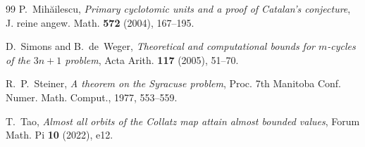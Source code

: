 \documentclass[11pt, a4paper]{amsart}
\theoremstyle{plain}
\theoremstyle{definition}
\theoremstyle{remark}
\begin{document}
\begin{thebibliography}{99}
P.~Mih\u{a}ilescu,
\emph{Primary cyclotomic units and a proof of Catalan's
conjecture},
J. reine angew. Math. \textbf{572} (2004), 167--195.

D.~Simons and B.~de~Weger,
\emph{Theoretical and computational bounds for $m$-cycles of
the $3n + 1$ problem},
Acta Arith. \textbf{117} (2005), 51--70.

R.~P.~Steiner,
\emph{A theorem on the Syracuse problem},
Proc. 7th Manitoba Conf. Numer. Math. Comput.,
1977, 553--559.

T.~Tao,
\emph{Almost all orbits of the Collatz map attain almost bounded
values},
Forum Math. Pi \textbf{10} (2022), e12.

\end{thebibliography}
\end{document}
